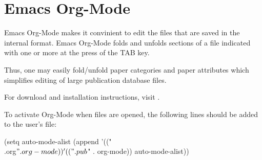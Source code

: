 \chapter{Emacs Org-Mode}
\label{orgmode}

Emacs Org-Mode makes it convinient to edit the files that are saved in
the internal  format. Emacs Org-Mode folds and unfolds sections
of a file indicated with one or more \emp{*} at the press of the TAB
key.

Thus, one may easily fold/unfold paper categories and paper attributes
which simplifies editing of large publication database files.

For download and installation instructions, visit
.

To activate Org-Mode when  files are opened, the following
lines should be added to the user's  file:

\begin{code}
(setq auto-mode-alist
      (append '(("\\.org$" . org-mode))
              '(("\\.pub$" . org-mode))
              auto-mode-alist))
\end{code}
